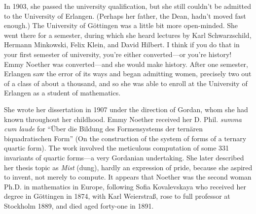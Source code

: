\documentclass[twoside,symmetric]{tufte-handout}
\begin{document}
%
%

In 1903, she passed the university qualification, but she still couldn't be admitted to the University of Erlangen. (Perhaps her father, the Dean, hadn't moved fast enough.) The University of G\"ottingen was a little bit more open-minded. She went there for a semester, during which she heard lectures by Karl Schwarzschild, Hermann Minkowski, Felix Klein, and David Hilbert. I think if you do that in your first semester of university, you're either converted---or you're history! Emmy Noether was converted---and she would make history. After one semester, Erlangen saw the error of its ways and began admitting women, precisely two out of a class of about a thousand, and so she was able to enroll at the University of Erlangen as a student of mathematics.

She wrote her dissertation in 1907 under the direction of Gordan, whom she had known throughout her childhood. Emmy Noether received her D. Phil. \emph{summa cum laude} for ``Über die Bildung des Formensystems der ternären biquadratischen Form'' (On the construction of the system of forms of a ternary quartic form). The work involved the meticulous computation of some 331 invariants of quartic forms---a very Gordanian undertaking. She later described her thesis topic as \emph{Mist} (dung), hardly an expression of pride, because she aspired to invent, not merely to compute. It appears that Noether was the second woman Ph.D. in mathematics in Europe, following Sofia Kovalevskaya who received her degree in G\"ottingen in 1874, with Karl Weierstra\ss, rose to full professor at Stockholm 1889, and died aged forty-one in 1891.
\end{document}
